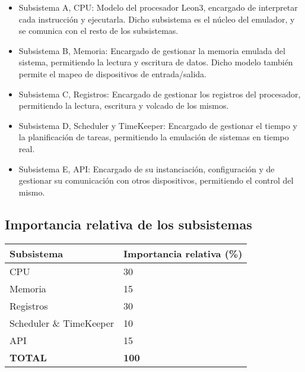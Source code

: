 \documentclass[
  11pt, %
  codirector, %
]{charter}
\begin{document}
\begin{itemize}
\item Subsistema A, CPU: Modelo del procesador Leon3, encargado de interpretar cada instrucción y ejecutarla. Dicho subsistema es el núcleo del emulador, y se comunica con el resto de los subsistemas.
\item Subsistema B, Memoria: Encargado de gestionar la memoria emulada del sistema, permitiendo la lectura y escritura de datos. Dicho modelo también permite el mapeo de dispositivos de entrada/salida.
\item Subsistema C, Registros: Encargado de gestionar los registros del procesador, permitiendo la lectura, escritura y volcado de los mismos.
\item Subsistema D, Scheduler y TimeKeeper: Encargado de gestionar el tiempo y la planificación de tareas, permitiendo la emulación de sistemas en tiempo real.
\item Subsistema E, API: Encargado de su instanciación, configuración y de gestionar su comunicación con otros dispositivos, permitiendo el control del mismo.
\end{itemize}

\subsection{Importancia relativa de los subsistemas}
\label{sec:importancia_relativa_de_los_subsistemas}

\begin{table}[h!]
	\centering
	\begin{tabular}{ | m{5cm} | m{5cm} | }
		\hline
		\rowcolor{gray!50} %
		\textbf{Subsistema} & \textbf{Importancia relativa (\%)} \\ \hline
    CPU & 30 \\ \hline
    Memoria & 15 \\ \hline
    Registros & 30 \\ \hline
    Scheduler \& TimeKeeper & 10 \\ \hline
    API & 15 \\ \hline
    \rowcolor{gray!50} %
		\textbf{TOTAL} & \textbf{100}
    \\ \hline
	\end{tabular}

\end{table}
\end{document}
